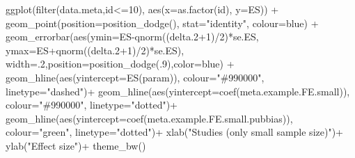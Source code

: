 \documentclass[
]{book}
\newenvironment{Shaded}{\begin{snugshade}}{\end{snugshade}}
\newcommand{\AttributeTok}[1]{\textcolor[rgb]{0.77,0.63,0.00}{#1}}
\newcommand{\DecValTok}[1]{\textcolor[rgb]{0.00,0.00,0.81}{#1}}
\newcommand{\FloatTok}[1]{\textcolor[rgb]{0.00,0.00,0.81}{#1}}
\newcommand{\FunctionTok}[1]{\textcolor[rgb]{0.00,0.00,0.00}{#1}}
\newcommand{\NormalTok}[1]{#1}
\newcommand{\SpecialCharTok}[1]{\textcolor[rgb]{0.00,0.00,0.00}{#1}}
\newcommand{\StringTok}[1]{\textcolor[rgb]{0.31,0.60,0.02}{#1}}
\theoremstyle{definition}
\theoremstyle{definition}
\theoremstyle{definition}
\theoremstyle{definition}
\theoremstyle{remark}
\begin{document}
\begin{Shaded}
\begin{Highlighting}[]
  \FunctionTok{ggplot}\NormalTok{(}\FunctionTok{filter}\NormalTok{(data.meta,id}\SpecialCharTok{\textless{}=}\DecValTok{10}\NormalTok{), }\FunctionTok{aes}\NormalTok{(}\AttributeTok{x=}\FunctionTok{as.factor}\NormalTok{(id), }\AttributeTok{y=}\NormalTok{ES)) }\SpecialCharTok{+}
      \FunctionTok{geom\_point}\NormalTok{(}\AttributeTok{position=}\FunctionTok{position\_dodge}\NormalTok{(), }\AttributeTok{stat=}\StringTok{"identity"}\NormalTok{, }\AttributeTok{colour=}\StringTok{\textquotesingle{}blue\textquotesingle{}}\NormalTok{) }\SpecialCharTok{+}
      \FunctionTok{geom\_errorbar}\NormalTok{(}\FunctionTok{aes}\NormalTok{(}\AttributeTok{ymin=}\NormalTok{ES}\SpecialCharTok{{-}}\FunctionTok{qnorm}\NormalTok{((delta}\FloatTok{.2}\SpecialCharTok{+}\DecValTok{1}\NormalTok{)}\SpecialCharTok{/}\DecValTok{2}\NormalTok{)}\SpecialCharTok{*}\NormalTok{se.ES, }\AttributeTok{ymax=}\NormalTok{ES}\SpecialCharTok{+}\FunctionTok{qnorm}\NormalTok{((delta}\FloatTok{.2}\SpecialCharTok{+}\DecValTok{1}\NormalTok{)}\SpecialCharTok{/}\DecValTok{2}\NormalTok{)}\SpecialCharTok{*}\NormalTok{se.ES), }\AttributeTok{width=}\NormalTok{.}\DecValTok{2}\NormalTok{,}\AttributeTok{position=}\FunctionTok{position\_dodge}\NormalTok{(.}\DecValTok{9}\NormalTok{),}\AttributeTok{color=}\StringTok{\textquotesingle{}blue\textquotesingle{}}\NormalTok{) }\SpecialCharTok{+}
      \FunctionTok{geom\_hline}\NormalTok{(}\FunctionTok{aes}\NormalTok{(}\AttributeTok{yintercept=}\FunctionTok{ES}\NormalTok{(param)), }\AttributeTok{colour=}\StringTok{"\#990000"}\NormalTok{, }\AttributeTok{linetype=}\StringTok{"dashed"}\NormalTok{)}\SpecialCharTok{+}
      \FunctionTok{geom\_hline}\NormalTok{(}\FunctionTok{aes}\NormalTok{(}\AttributeTok{yintercept=}\FunctionTok{coef}\NormalTok{(meta.example.FE.small)), }\AttributeTok{colour=}\StringTok{"\#990000"}\NormalTok{, }\AttributeTok{linetype=}\StringTok{"dotted"}\NormalTok{)}\SpecialCharTok{+}
      \FunctionTok{geom\_hline}\NormalTok{(}\FunctionTok{aes}\NormalTok{(}\AttributeTok{yintercept=}\FunctionTok{coef}\NormalTok{(meta.example.FE.small.pubbias)), }\AttributeTok{colour=}\StringTok{"green"}\NormalTok{, }\AttributeTok{linetype=}\StringTok{"dotted"}\NormalTok{)}\SpecialCharTok{+}
      \FunctionTok{xlab}\NormalTok{(}\StringTok{"Studies (only small sample size)"}\NormalTok{)}\SpecialCharTok{+}
      \FunctionTok{ylab}\NormalTok{(}\StringTok{"Effect size"}\NormalTok{)}\SpecialCharTok{+}
      \FunctionTok{theme\_bw}\NormalTok{()}


\end{Highlighting}
\end{Shaded}
\end{document}

